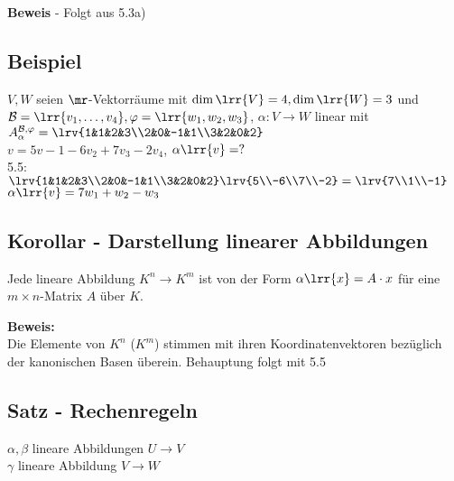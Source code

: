 
	\textbf{Beweis} - Folgt aus 5.3a)

\subsection{Beispiel}
	$V,W$ seien $\mr$-Vektorräume mit $\dim\lrr{V}=4, \dim\lrr{W}=3$ und $\mathcal{B}=\lrr{v_1,\dots,v_4},\varphi=\lrr{w_1,w_2,w_3}$, $\alpha:V\rightarrow W$ linear mit \\
	$A_\alpha^{\mathcal{B},\varphi}=\lrv{1&1&2&3\\2&0&-1&1\\3&2&0&2}$\\
	$v=5v-1-6v_2+7v_3-2v_4$, $\alpha\lrr{v}=?$\\
	5.5:$\lrv{1&1&2&3\\2&0&-1&1\\3&2&0&2}\lrv{5\\-6\\7\\-2}=\lrv{7\\1\\-1}$\\
	$\alpha\lrr{v}=7w_1+w_2-w_3$

\subsection{Korollar - Darstellung linearer Abbildungen}
	Jede lineare Abbildung $K^n\rightarrow K^m$ ist von der Form $\alpha\lrr{x}=A\cdot x$ für eine $m\times n$-Matrix $A$ über $K$.

	\textbf{Beweis:}\\
	Die Elemente von $K^n$ ($K^m$) stimmen mit ihren Koordinatenvektoren bezüglich der kanonischen Basen überein. Behauptung folgt mit 5.5

\subsection{Satz - Rechenregeln}
	$\alpha,\beta$ lineare Abbildungen $U\rightarrow V$\\
	$\gamma$ lineare Abbildung $V\rightarrow W$

